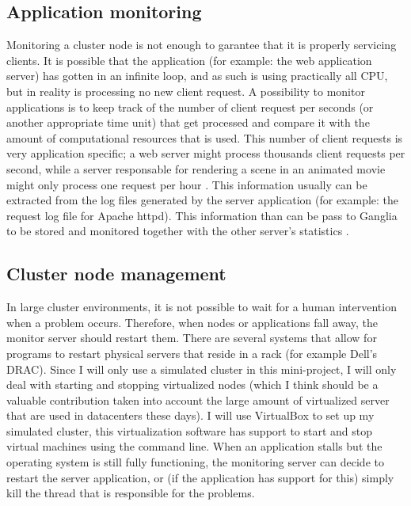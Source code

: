 \documentclass[12pt]{report}
\begin{document}
\subsection{Application monitoring}
Monitoring a cluster node is not enough to garantee that it is
properly servicing clients. It is possible that the application (for
example: the web application server) has gotten in an infinite loop,
and as such is using practically all CPU, but in reality is
processing no new client request.
A possibility to monitor applications is to keep track of the number of
client request per seconds (or another appropriate time unit) that get
processed and compare it with the amount of computational resources
that is used.
This number of client requests is very application specific; a web
server might process thousands client requests per second, while a
server responsable for rendering a scene in an animated movie might only process
one request per hour \cite{apm:2013}.
This information usually can be extracted from the log files generated
by the server application (for example: the request log file for
Apache httpd). This information than can be pass to Ganglia to be
stored and monitored together with the other server's statistics
\cite{ganglia:2013}.

\subsection{Cluster node management}
In large cluster environments, it is not possible to wait for
a human intervention when a problem occurs. Therefore, when nodes or
applications fall away, the monitor server should restart them.
There are several systems that allow for programs to restart
physical servers that reside in a rack (for example Dell's DRAC).
Since I will only use a simulated cluster in this mini-project, I will
only deal with starting and stopping virtualized nodes (which I think should
be a valuable contribution taken into account the large amount of
virtualized server that are used in datacenters these days).
I will use VirtualBox to set up my simulated cluster, this
virtualization software has support to start and stop virtual machines
using the command line.
When an application stalls but the operating system is still fully
functioning, the monitoring server can decide to restart the server application, or
(if the application has support for this) simply kill the thread that
is responsible for the problems.
\end{document}
